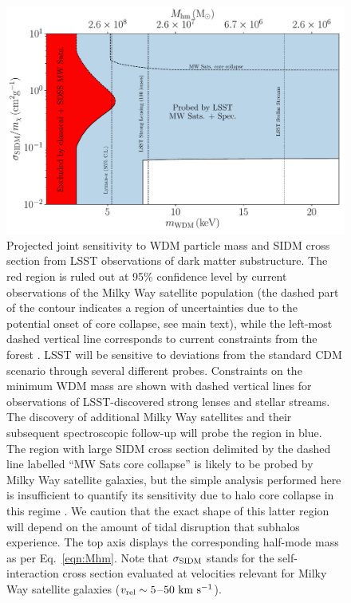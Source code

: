 \begin{figure}[t]
\centering
\includegraphics[width=0.75\columnwidth]{figures/SIDM_WDM_figw_coll.pdf}
\caption{\label{fig:sidm_wdm} Projected joint sensitivity to WDM particle mass and SIDM cross section from LSST observations of dark matter substructure. 
The red region is ruled out at 95\% confidence level by current observations of the Milky Way satellite population (the dashed part of the contour indicates a region of uncertainties due to the potential onset of core collapse, see main text), while the left-most dashed vertical line corresponds to current constraints from the \Lya forest \citep{2017PhRvD..96b3522I}.
LSST will be sensitive to deviations from the standard CDM scenario through several different probes.
Constraints on the minimum WDM mass are shown with dashed vertical lines for observations of LSST-discovered strong lenses and stellar streams.
The discovery of additional Milky Way satellites and their subsequent spectroscopic follow-up will probe the region in blue.
The region with large SIDM cross section delimited by the dashed line labelled ``MW Sats core collapse'' is likely to be probed by Milky Way satellite galaxies, but the simple analysis performed here is insufficient to quantify its sensitivity due to halo core collapse in this regime \citep{Nishikawa:2019lsc}. 
We caution that the exact shape of this latter region will depend on the amount of tidal disruption that subhalos experience.  
The top axis displays the corresponding half-mode mass as per Eq.~\eqref{eqn:Mhm}. 
Note that $\sigma_{\rm SIDM}$ stands for the self-interaction cross section evaluated at velocities relevant for Milky Way satellite galaxies ($v_{\rm rel}\sim5$--$50 \mathrm{\,\mathrm{\,km}\,\mathrm{\,s}^{-1}}$). }
\end{figure}

